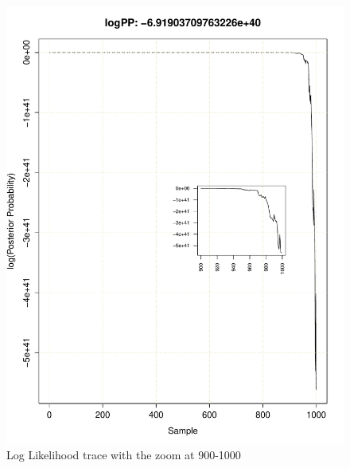 \documentclass[11pt]{labbook}
\begin{document}
    \begin{figure}
        \centering
        \includegraphics[scale=.75]{FONSE_Plots/2016/June_29/LogLikeTrace_900-1000}
        \caption{Log Likelihood trace with the zoom at 900-1000}
        \label{fig:JUN29_900-1000}
    \end{figure}
    
\end{document}
